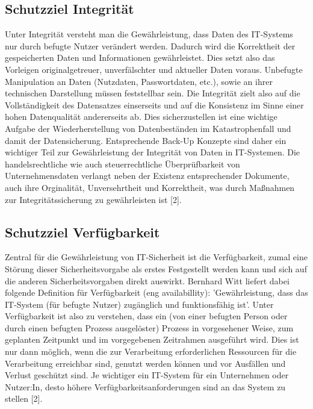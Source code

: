 \documentclass[a4paper, 11pt]{article}
\begin{document}
\subsection{Schutzziel Integrität}
Unter Integrität versteht man die Gewährleistung, dass Daten des IT-Systems nur durch befugte Nutzer verändert werden. Dadurch wird die Korrektheit der gespeicherten Daten und Informationen gewährleistet. Dies setzt also das Vorleigen originalgetreuer, unverfälschter und aktueller Daten voraus. Unbefugte Manipulation an Daten (Nutzdaten, Passwortdaten, etc.), sowie an ihrer technischen Darstellung müssen feststellbar sein. Die Integrität zielt also auf die Vollständigkeit des Datensatzes einserseits und auf die Konsistenz im Sinne einer hohen Datenqualität andererseits ab. Dies sicherzustellen ist eine wichtige Aufgabe der Wiederherstellung von Datenbeständen im Katastrophenfall und damit der Datensicherung. Entsprechende Back-Up Konzepte sind daher ein wichtiger Teil zur Gewährleistung der Integrität von Daten in IT-Systemen. Die handelsrechtliche wie auch steuerrechtliche  Überprüfbarkeit von Unternehmensdaten verlangt neben der Existenz entsprechender Dokumente, auch ihre Orginalität, Unversehrtheit und Korrektheit, was durch Maßnahmen zur Integritätssicherung zu gewährleisten ist [2].

\subsection{Schutzziel Verfügbarkeit}
Zentral für die Gewährleistung von IT-Sicherheit ist die Verfügbarkeit, zumal eine Störung dieser Sicherheitsvorgabe als erstes Festgestellt werden kann und sich auf die anderen Sicherheitsvorgaben direkt auswirkt. Bernhard Witt liefert dabei folgende Definition für Verfügbarkeit (eng availabillity): 'Gewährleistung, dass das IT-System (für befugte Nutzer) zugänglich und funktionsfähig ist'. Unter Verfügbarkeit ist also zu verstehen, dass ein (von einer befugten Person oder durch einen befugten Prozess ausgelöster) Prozess in vorgesehener Weise, zum geplanten Zeitpunkt und im vorgegebenen Zeitrahmen ausgeführt wird. Dies ist nur dann möglich, wenn die zur Verarbeitung erforderlichen Ressourcen für die Verarbeitung erreichbar sind, genutzt werden können und vor Ausfällen und Verlust geschützt sind. Je wichtiger ein IT-System für ein Unternehmen oder Nutzer:In, desto höhere Verfügbarkeitsanforderungen sind an das System zu stellen [2]. 
\end{document}
